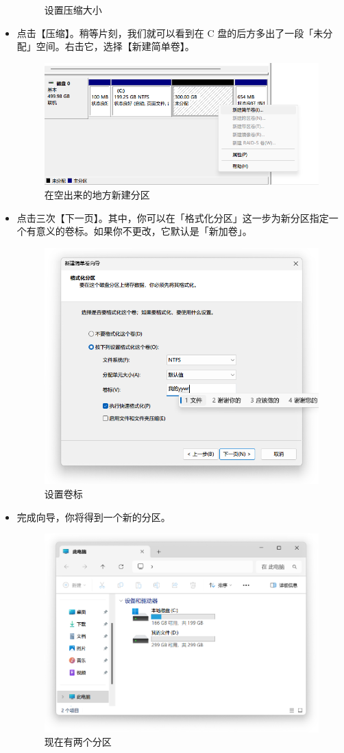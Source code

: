 \begin{itemize}
\begin{figure}[htb!]
      \caption{设置压缩大小}
      \label{fig:Setting_size}
    \end{figure}
  \item 点击【压缩】。稍等片刻，我们就可以看到在 C 盘的后方多出了一段「未分配」空间。右击它，选择【新建简单卷】。
  \begin{figure}[htb!]
    \centering
    \includegraphics[width=.6\textwidth]{assets/appendix/Create_new_volume.png}
    \caption{在空出来的地方新建分区}
    \label{fig:Create_new_volume}
  \end{figure}
  \item 点击三次【下一页】。其中，你可以在「格式化分区」这一步为新分区指定一个有意义的卷标。如果你不更改，它默认是「新加卷」。
  \begin{figure}[htb!]
    \centering
    \includegraphics[width=.6\textwidth]{assets/appendix/Setting_label.png}
    \caption{设置卷标}
    \label{fig:Setting_label}
  \end{figure}
  \item 完成向导，你将得到一个新的分区。
    \begin{figure}[htb!]
      \centering
      \includegraphics[width=.65\textwidth]{assets/appendix/Two_partitions.png}
      \caption{现在有两个分区}
      \label{fig:Two_partitions}
    \end{figure}
\end{itemize}
    
